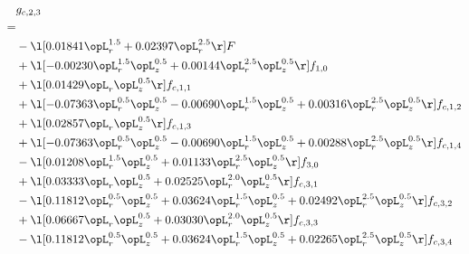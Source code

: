 \begin{alignat}{2} 
\label{eq:g_23_0} 
& g_{c,2,3} \nonumber \\ 
 = \\ 
& - \l[  0.01841 \opL_r^{1.5} +  0.02397 \opL_r^{2.5}  \r] F \nonumber \\ 
& + \l[  -0.00230 \opL_r^{1.5} \opL_z^{0.5} +  0.00144 \opL_r^{2.5} \opL_z^{0.5}  \r] f_{1,0} \nonumber \\ 
& + \l[  0.01429 \opL_r \opL_z^{0.5}  \r] f_{c,1,1} \nonumber \\ 
& + \l[  -0.07363 \opL_r^{0.5} \opL_z^{0.5}   -0.00690 \opL_r^{1.5} \opL_z^{0.5} +  0.00316 \opL_r^{2.5} \opL_z^{0.5}  \r] f_{c,1,2} \nonumber \\ 
& + \l[  0.02857 \opL_r \opL_z^{0.5}  \r] f_{c,1,3} \nonumber \\ 
& + \l[  -0.07363 \opL_r^{0.5} \opL_z^{0.5}   -0.00690 \opL_r^{1.5} \opL_z^{0.5} +  0.00288 \opL_r^{2.5} \opL_z^{0.5}  \r] f_{c,1,4} \nonumber \\ 
& - \l[  0.01208 \opL_r^{1.5} \opL_z^{0.5} +  0.01133 \opL_r^{2.5} \opL_z^{0.5}  \r] f_{3,0} \nonumber \\ 
& + \l[  0.03333 \opL_r \opL_z^{0.5} +  0.02525 \opL_r^{2.0} \opL_z^{0.5}  \r] f_{c,3,1} \nonumber \\ 
& - \l[  0.11812 \opL_r^{0.5} \opL_z^{0.5} +  0.03624 \opL_r^{1.5} \opL_z^{0.5} +  0.02492 \opL_r^{2.5} \opL_z^{0.5}  \r] f_{c,3,2} \nonumber \\ 
& + \l[  0.06667 \opL_r \opL_z^{0.5} +  0.03030 \opL_r^{2.0} \opL_z^{0.5}  \r] f_{c,3,3} \nonumber \\ 
& - \l[  0.11812 \opL_r^{0.5} \opL_z^{0.5} +  0.03624 \opL_r^{1.5} \opL_z^{0.5} +  0.02265 \opL_r^{2.5} \opL_z^{0.5}  \r] f_{c,3,4} \nonumber \\ 
\end{alignat} 



